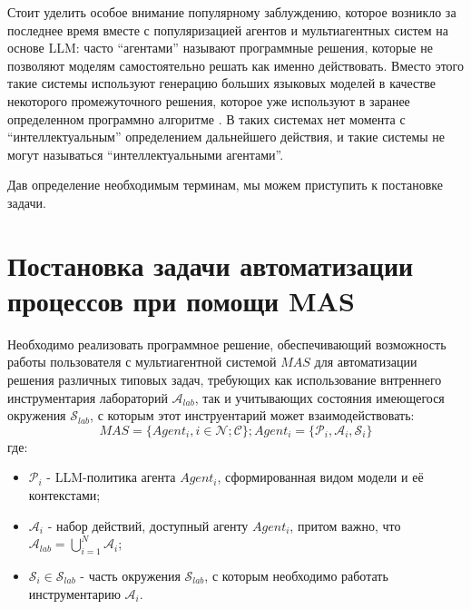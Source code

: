 Стоит уделить особое внимание популярному заблуждению, которое возникло за последнее 
время вместе с популяризацией агентов и мультиагентных систем на основе LLM: часто 
``агентами'' называют программные решения, которые не позволяют моделям самостоятельно 
решать как именно действовать. Вместо этого такие системы используют генерацию больших
языковых моделей в качестве некоторого промежуточного решения, которое уже
используют в заранее определенном программно алгоритме \cite{aide}. 
В таких системах нет момента с ``интеллектуальным'' определением дальнейшего действия, 
и такие системы не могут называться ``интеллектуальными агентами''.

Дав определение необходимым терминам, мы можем приступить к постановке задачи. 

\section{Постановка задачи автоматизации процессов при помощи MAS} \label{ch1:sec2}

Необходимо реализовать программное решение, обеспечивающий возможность работы 
пользователя с мультиагентной системой $MAS$ для автоматизации решения 
различных типовых задач, требующих как использование внтреннего инструментария 
лабораторий $\mathcal{A}_{lab}$, так и учитывающих состояния имеющегося окружения 
$\mathcal{S}_{lab}$, с которым этот инструентарий может взаимодействовать:
\begin{equation}\label{eq3}
    MAS = \{Agent_i, i\in\mathcal{N}; \mathcal{C}\};
    Agent_i = \{\mathcal{P}_i, \mathcal{A}_i, \mathcal{S}_i\}
\end{equation}
где:
\begin{itemize}
    \item $\mathcal{P}_i$ - LLM-политика агента $Agent_i$, сформированная видом модели и её 
контекстами;
    \item $\mathcal{A}_i$ - набор действий, доступный агенту $Agent_i$, притом важно, что
$\mathcal{A}_{lab} = \bigcup\limits_{i=1}^N \mathcal{A}_i$;
    \item $\mathcal{S}_i \in \mathcal{S}_{lab}$ - часть окружения $\mathcal{S}_{lab}$, 
с которым необходимо работать инструментарию $\mathcal{A}_i$.
\end{itemize}

